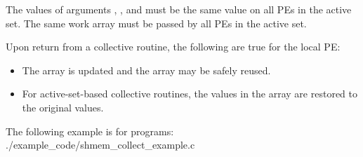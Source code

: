 \begin{apidefinition}
{\begin{DeprecateBlock}
    The values of arguments , , and 
    must be the same value on all \acp{PE} in the active set. The same
     work array must be passed by all \acp{PE} in the active set.
    
    Upon return from a collective routine, the following are true for the local
    \ac{PE}:
    \begin{itemize}
    \item The \dest{} array is updated and the \source{} array may be safely reused. 
    \item For active-set-based collective routines, the values in the  array are
    restored to the original values.
    \end{itemize}
\end{DeprecateBlock}
}



\begin{apiexamples}

\apicexample
    {The following  example is for \CorCpp{} programs:}
    {./example_code/shmem_collect_example.c}
    {}

\end{apiexamples}

\end{apidefinition}
